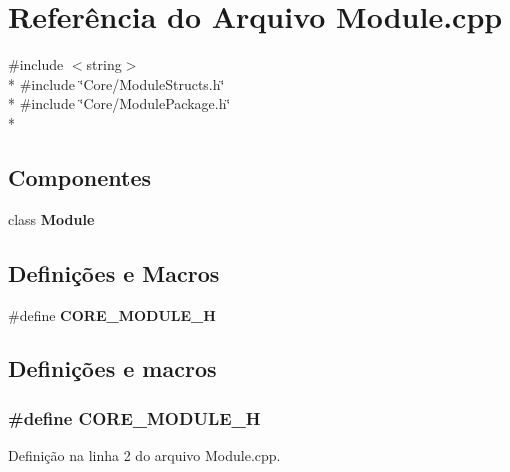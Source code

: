 \section{Referência do Arquivo Module.\+cpp}
\label{_module_8cpp}
{\ttfamily \#include $<$string$>$}\\*
{\ttfamily \#include \char`\"{}Core/\+Module\+Structs.\+h\char`\"{}}\\*
{\ttfamily \#include \char`\"{}Core/\+Module\+Package.\+h\char`\"{}}\\*
\subsection*{Componentes}
\begin{DoxyCompactItemize}
\item 
class {\bf Module}
\end{DoxyCompactItemize}
\subsection*{Definições e Macros}
\begin{DoxyCompactItemize}
\item 
\#define {\bf C\+O\+R\+E\+\_\+\+M\+O\+D\+U\+L\+E\+\_\+H}
\end{DoxyCompactItemize}


\subsection{Definições e macros}
\subsubsection[{C\+O\+R\+E\+\_\+\+M\+O\+D\+U\+L\+E\+\_\+H}]{\setlength{\rightskip}{0pt plus 5cm}\#define C\+O\+R\+E\+\_\+\+M\+O\+D\+U\+L\+E\+\_\+H}\label{_module_8cpp_a4ad4a3259b0b2a1e702cc8ae1613c056}


Definição na linha 2 do arquivo Module.\+cpp.

